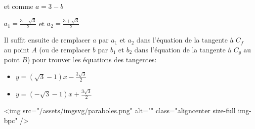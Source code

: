 \begin{corrige}
          et comme $a=3-b$
          \par
          $a_{1}=\frac{3-\sqrt{3}}{2}$ et $a_{2}=\frac{3+\sqrt{3}}{2}$
          \par
          Il suffit ensuite de remplacer $a$ par $a_{1}$ et $a_{2}$ dans l'équation de la tangente à $C_{f}$ au point $A$ (ou de remplacer $b$ par $b_{1}$ et $b_{2}$ dans l'équation de la tangente à $C_{g}$ au point $B$) pour trouver les équations des tangentes:
          \begin{itemize}
               \item
               $y=\left(\sqrt{3}-1\right)x-\frac{3\sqrt{3}}{2}$
               \item
               $y=\left(-\sqrt{3}-1\right)x+\frac{3\sqrt{3}}{2}$
          \end{itemize}
          <img src="/assets/imgsvg/paraboles.png" alt="" class="aligncenter size-full  img-bpc" />
     \end{corrige}
